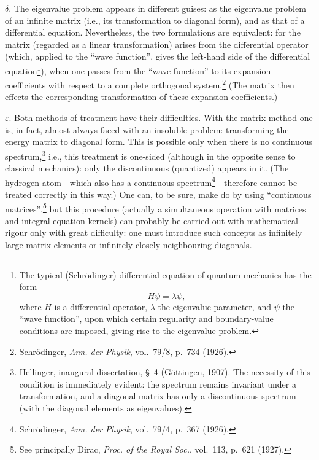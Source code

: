 \documentclass[fontsize=13pt,paper=b5,twoside,bookmarkpackage=false]{scrartcl}
\begin{document}
\par\noindent $\delta$. The eigenvalue problem appears in different guises: as the eigenvalue problem of an infinite matrix (i.e., its transformation to diagonal form), and as that of a differential equation. Nevertheless, the two formulations are equivalent: for the matrix (regarded as a linear transformation) arises from the differential operator (which, applied to the ``wave function'', gives the left-hand side of the differential equation\footnote[2]{\label{fn:2}The typical (Schrödinger) differential equation of quantum mechanics has the form
\[
H\psi=\lambda\psi,
\]
where $H$ is a differential operator, $\lambda$ the eigenvalue parameter, and $\psi$ the ``wave function'', upon which certain regularity and boundary-value conditions are imposed, giving rise to the eigenvalue problem.}), when one passes from the ``wave function'' to its expansion coefficients with respect to a complete orthogonal system.\footnote[3]{\label{fn:3}Schrödinger, \emph{Ann. der Physik}, vol.~79/8, p.~734 (1926).} (The matrix then effects the corresponding transformation of these expansion coefficients.)

\par\noindent $\varepsilon$. Both methods of treatment have their difficulties. With the matrix method one is, in fact, almost always faced with an insoluble problem: transforming the energy matrix to diagonal form. This is possible only when there is no continuous spectrum,\footnote[4]{\label{fn:4}Hellinger, inaugural dissertation, \S~4 (Göttingen, 1907). The necessity of this condition is immediately evident: the spectrum remains invariant under a transformation, and a diagonal matrix has only a discontinuous spectrum (with the diagonal elements as eigenvalues).} i.e., this treatment is one-sided (although in the opposite sense to classical mechanics): only the discontinuous (quantized) appears in it. (The hydrogen atom---which also has a continuous spectrum\footnote[5]{\label{fn:5}Schrödinger, \emph{Ann. der Physik}, vol.~79/4, p.~367 (1926).}---therefore cannot be treated correctly in this way.) One can, to be sure, make do by using ``continuous matrices'',\footnote[6]{\label{fn:6}See principally Dirac, \emph{Proc. of the Royal Soc.}, vol.~113, p.~621 (1927).} but this procedure (actually a simultaneous operation with matrices and integral-equation kernels) can probably be carried out with mathematical rigour only with great difficulty: one must introduce such concepts as infinitely large matrix elements or infinitely closely neighbouring diagonals.
\end{document}
